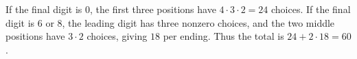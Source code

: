 If the final digit is $0$, the first three positions have $4\cdot3\cdot2=24$ choices. If the final digit is $6$ or $8$, the leading digit has three nonzero choices, and the two middle positions have $3\cdot2$ choices, giving $18$ per ending. Thus the total is $24+2\cdot18=\boxed{60}$.
